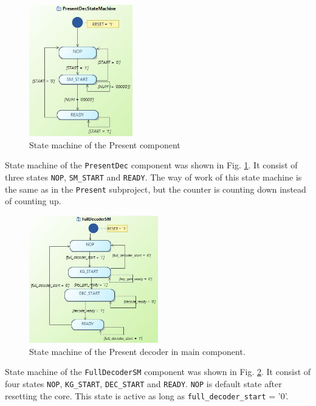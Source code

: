 \documentclass{gajewski}
\begin{document}
\begin{figure}[!ht]%
    \begin{center}
    \includegraphics[width=0.4\textwidth]{img/PresentDecStateMachine.jpg}
    \caption{%
        State machine of the Present component
     }%
    \label{presentDecSM}
    \end{center}
 \end{figure}

State machine of the \texttt{PresentDec} component was shown in Fig. \ref{presentDecSM}. It consist of three states \texttt{NOP}, \texttt{SM\_START} and \texttt{READY}. The way of work of this state machine is the same as in the \texttt{Present} subproject, but the counter is counting down instead of counting up.

\begin{figure}[!ht]%
    \begin{center}
    \includegraphics[width=0.5\textwidth]{img/FullDecoderSM.jpg}
    \caption{%
        State machine of the Present decoder in main component.
     }%
    \label{presentFullDecSM}
    \end{center}
 \end{figure}

State machine of the \texttt{FullDecoderSM} component was shown in Fig. \ref{presentFullDecSM}. It consist of four states \texttt{NOP}, \texttt{KG\_START}, \texttt{DEC\_START} and \texttt{READY}. \texttt{NOP} is default state after resetting the core. This state is active as long as \texttt{full\_decoder\_start} = '0'.
\end{document}
